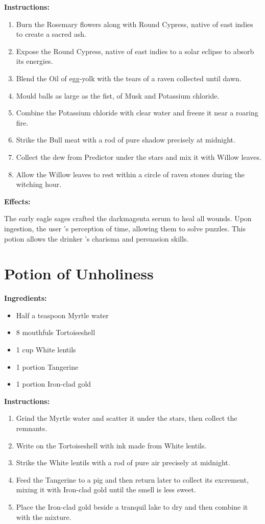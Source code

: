 \documentclass{article}
\begin{document}
\textbf{Instructions:}

\begin{enumerate}
  \item Burn the Rosemary flowers along with Round Cypress, native of east indies to create a sacred ash.
  \item Expose the Round Cypress, native of east indies to a solar eclipse to absorb its energies.
  \item Blend the Oil of egg-yolk with the tears of a raven collected until dawn.
  \item Mould balls as large as the fist, of Musk and Potassium chloride.
  \item Combine the Potassium chloride with clear water and freeze it near a roaring fire.
  \item Strike the Bull meat with a rod of pure shadow precisely at midnight.
  \item Collect the dew from Predictor under the stars and mix it with Willow leaves.
  \item Allow the Willow leaves to rest within a circle of raven stones during the witching hour.
\end{enumerate}

\textbf{Effects:}

The early eagle sages crafted the darkmagenta serum to heal all wounds. Upon ingestion, the user 's perception of time, allowing them to solve puzzles. This potion allows the drinker 's charisma and persuasion skills.

\newpage
\section*{Potion of Unholiness}

\textbf{Ingredients:}

\begin{itemize}
  \item Half a teaspoon Myrtle water
  \item 8 mouthfuls Tortoiseshell
  \item 1 cup White lentils
  \item 1 portion Tangerine
  \item 1 portion Iron-clad gold
\end{itemize}

\textbf{Instructions:}

\begin{enumerate}
  \item Grind the Myrtle water and scatter it under the stars, then collect the remnants.
  \item Write on the Tortoiseshell with ink made from White lentils.
  \item Strike the White lentils with a rod of pure air precisely at midnight.
  \item Feed the Tangerine to a pig and then return later to collect its excrement, mixing it with Iron-clad gold until the smell is less sweet.
  \item Place the Iron-clad gold beside a tranquil lake to dry and then combine it with the mixture.
\end{enumerate}
\end{document}
